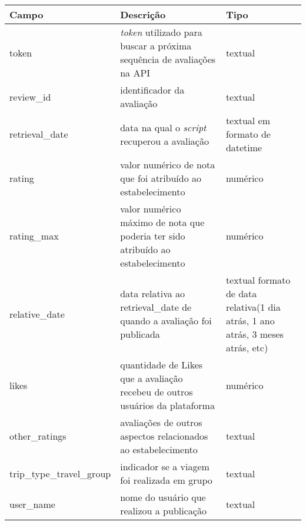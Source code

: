 \begin{table}[]
	\centering
	\begin{tabular}{|l|p{5cm}|p{5cm}|}
		\hline
		\textbf{Campo}            & \textbf{Descrição}                                                              & \textbf{Tipo}                                                                  \\
		\hline
		token                     & \emph{token} utilizado para buscar a próxima sequência de avaliações na API     & textual                                                                        \\
		\hline
		review\_id                & identificador da avaliação                                                      & textual                                                                        \\
		\hline
		retrieval\_date           & data na qual o \emph{script} recuperou a avaliação                              & textual em formato de datetime                                                 \\
		\hline
		rating                    & valor numérico de nota que foi atribuído ao estabelecimento                     & numérico                                                                       \\
		\hline
		rating\_max               & valor numérico máximo de nota que poderia ter sido atribuído ao estabelecimento & numérico                                                                       \\
		\hline
		relative\_date            & data relativa ao retrieval\_date de quando a avaliação foi publicada            & textual formato de data relativa(1 dia atrás, 1 ano atrás, 3 meses atrás, etc) \\
		\hline
		likes                     & quantidade de Likes que a avaliação recebeu de outros usuários da plataforma    & numérico                                                                       \\
		\hline
		other\_ratings            & avaliações de outros aspectos relacionados ao estabelecimento                   & textual                                                                        \\
		\hline
		trip\_type\_travel\_group & indicador se a viagem foi realizada em grupo                                    & textual                                                                        \\
		\hline
		user\_name                & nome do usuário que realizou a publicação                                       & textual                                                                        \\

\end{tabular}
\end{table}
